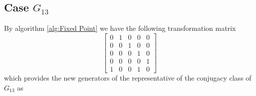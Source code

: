 \documentclass{article}
\theoremstyle{plain}
\theoremstyle{definition}
\newcommand{\tand}{\ensuremath{\,\,\, \text{and} \,\,\,}}
\begin{document}
\subsection{Case $G_{13}$}
By algorithm \ref{alg:Fixed Point} we have the following transformation matrix 
$$
\left[ \begin {array}{ccccc} 0&1&0&0&0\\ 0&0&1&0&0
\\ 0&0&0&1&0\\ 0&0&0&0&1
\\ 1&0&0&1&0\end {array} \right] 
$$
which provides the new generators of the representative of the conjugacy class of $G_{13}$ as
\end{document}
